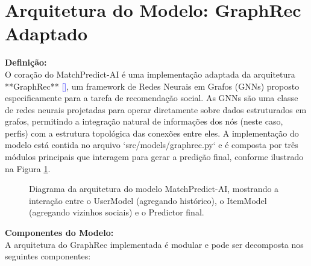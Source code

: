 \section{Arquitetura do Modelo: GraphRec Adaptado}
\label{sec:dev_arquitetura_modelo}

\textbf{Definição:} \\
O coração do MatchPredict-AI é uma implementação adaptada da arquitetura **GraphRec** \textcolor{blue}{[\cite{fan2019graphrec}]}, um framework de Redes Neurais em Grafos (GNNs) proposto especificamente para a tarefa de recomendação social. As GNNs são uma classe de redes neurais projetadas para operar diretamente sobre dados estruturados em grafos, permitindo a integração natural de informações dos nós (neste caso, perfis) com a estrutura topológica das conexões entre eles. A implementação do modelo está contida no arquivo `src/models/graphrec.py` e é composta por três módulos principais que interagem para gerar a predição final, conforme ilustrado na Figura \ref{fig:arquitetura_modelo_tcc2}.

\begin{figure}[hbt]
    \centering
    \caption{Diagrama da arquitetura do modelo MatchPredict-AI, mostrando a interação entre o UserModel (agregando histórico), o ItemModel (agregando vizinhos sociais) e o Predictor final.}
    \label{fig:arquitetura_modelo_tcc2}
\end{figure}

\textbf{Componentes do Modelo:} \\
A arquitetura do GraphRec implementada é modular e pode ser decomposta nos seguintes componentes:

